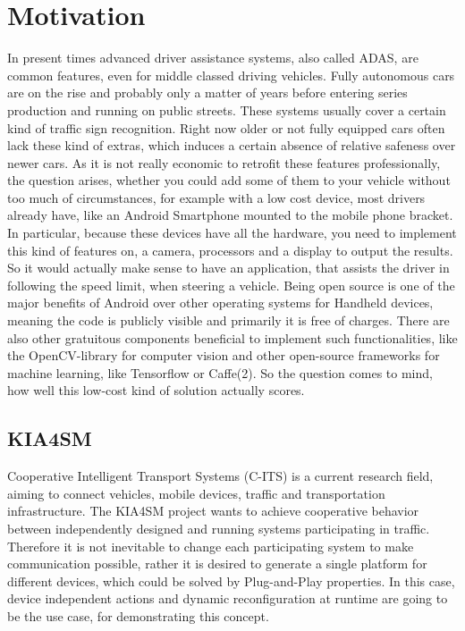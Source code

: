 
\chapter{Motivation}\label{chapter:motivation}
In present times advanced driver assistance systems, also called ADAS, are common features, even for middle classed driving vehicles. Fully autonomous cars are on the rise and probably only a matter of years before entering series production and running on public streets. These systems usually cover a certain kind of traffic sign recognition. Right now older or not fully equipped cars often lack these kind of extras, which induces a certain absence of relative safeness over newer cars. As it is not really economic to retrofit these features professionally, the question arises, whether you could add some of them to your vehicle without too much of circumstances, for example with a low cost device, most drivers already have, like an Android Smartphone mounted to the mobile phone bracket. In particular, because these devices have all the hardware, you need to implement this kind of features on, a camera, processors and a display to output the results. So it would actually make sense to have an application, that assists the driver in following the speed limit, when steering a vehicle. \newline
Being open source is one of the major benefits of Android over other operating systems for Handheld devices, meaning the code is publicly visible and primarily it is free of charges. There are also other gratuitous components beneficial to implement such functionalities, like the OpenCV-library for computer vision and other open-source frameworks for machine learning, like Tensorflow or Caffe(2). So the question comes to mind, how well this low-cost kind of solution actually scores. 

\section{KIA4SM}
Cooperative Intelligent Transport Systems (C-ITS) is a current research field, aiming to connect vehicles, mobile devices, traffic and transportation infrastructure\cite{kia4sm}. The KIA4SM project wants to achieve cooperative behavior between independently designed and running systems participating in traffic. Therefore it is not inevitable to change each participating system to make communication possible, rather it is desired to generate a single platform for different devices, which could be solved by Plug-and-Play properties. In this case, device independent actions and dynamic reconfiguration at runtime are going to be the use case, for demonstrating this concept. 

